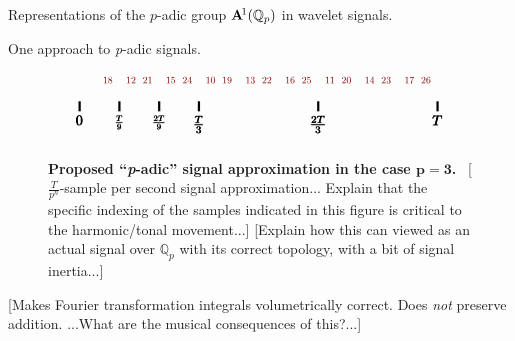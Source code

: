 \documentclass[letterpaper,11pt, reqno]{amsart}
\newtheorem{monodromy theorem}{Monodromy Theorem}[subsection]
\newtheorem{wild conjecture}[theorem]{Wild Conjecture}
\newtheorem{research objectives}{Research objectives}[subsection]
\newtheorem{research question}[theorem]{Research questions}
\newtheorem{aside question}[theorem]{Aside question}
\newtheorem{audio example}[theorem]{\loudspeaker[3] Example}
\newtheorem{blank remark}[theorem]{}
\newtheorem{terminology and comment}[theorem]{Terminology and comment}
\newtheorem{purity hypothesis}[theorem]{Purity hypothesis}
\newtheorem{corollary of the purity hypothesis}[theorem]{Corollary of the purity hypothesis}
\newcommand{\QQ} {{\mathbb Q}}
\numberwithin{equation}{theorem}
\begin{document}
\begin{section}{Representations of the $p$-adic group $\bold{A}^{\!1}(\mathbb{Q}_{p})$ in wavelet signals.}
\begin{subsection}{One approach to {\em p}-adic signals.}
\begin{figure}[ht]
$$\begin{tikzpicture}
	\node[red!50!black!100] at (2/3,.65) {\scalebox{.7}{$\ 18$}};
	\node[red!50!black!100] at (1+1/3,.65) {\scalebox{.7}{$12\ $}};
	\node[red!50!black!100] at (1+2/3,.65) {\scalebox{.7}{$\ 21$}};
	\node[red!50!black!100] at (2+1/3,.65) {\scalebox{.7}{$15\ $}};
	\node[red!50!black!100] at (2+2/3,.65) {\scalebox{.7}{$\ 24$}};
	\node[red!50!black!100] at (3+1/3,.65) {\scalebox{.7}{$10\ $}};
	\node[red!50!black!100] at (3+2/3,.65) {\scalebox{.7}{$\ 19$}};
	\node[red!50!black!100] at (4+1/3,.65) {\scalebox{.7}{$13\ $}};
	\node[red!50!black!100] at (4+2/3,.65) {\scalebox{.7}{$\ 22$}};
	\node[red!50!black!100] at (5+1/3,.65) {\scalebox{.7}{$16\ $}};
	\node[red!50!black!100] at (5+2/3,.65) {\scalebox{.7}{$\ 25$}};
	\node[red!50!black!100] at (6+1/3,.65) {\scalebox{.7}{$11\ $}};
	\node[red!50!black!100] at (6+2/3,.65) {\scalebox{.7}{$\ 20$}};
	\node[red!50!black!100] at (7+1/3,.65) {\scalebox{.7}{$14\ $}};
	\node[red!50!black!100] at (7+2/3,.65) {\scalebox{.7}{$\ 23$}};
	\node[red!50!black!100] at (8+1/3,.65) {\scalebox{.7}{$17\ $}};
	\node[red!50!black!100] at (8+2/3,.65) {\scalebox{.7}{$\ 26$}};
	\draw[black, ultra thick] (0,.125) -- (0,-.125);
	\draw[black, ultra thick] (1,.125) -- (1,-.125);
	\draw[black, ultra thick] (2,.125) -- (2,-.125);
	\draw[black, ultra thick] (3,.125) -- (3,-.125);
	\draw[black, ultra thick] (6,.125) -- (6,-.125);
	\draw[black, ultra thick] (9,.125) -- (9,-.125);
	\node[black] at (0,-.35) {\scalebox{1}{$\pmb{0}$}};
	\node[black] at (1,-.4) {\scalebox{.8}{$\pmb{\frac{T}{9}}$}};
	\node[black] at (2,-.4) {\scalebox{.8}{$\pmb{\frac{2T}{9}}$}};
	\node[black] at (3,-.45) {\scalebox{1}{$\pmb{\frac{T}{3}}$}};
	\node[black] at (6,-.45) {\scalebox{1}{$\pmb{\frac{2T}{3}}$}};
	\node[black] at (9,-.35) {\scalebox{1}{$\pmb{T}$}};
	\end{tikzpicture}
	$$
	\caption{{\bf Proposed ``{\em p}-adic'' signal approximation in the case $\pmb{p=3}$.}\ {\color{red} [$\frac{T}{p^n}$-sample per second signal approximation... Explain that the specific indexing of the samples indicated in this figure is critical to the harmonic/tonal movement...]} {\color{red} [Explain how this can viewed as an actual signal over $\QQ_{p}$ with its correct topology, with a bit of signal inertia...]}}
	\label{figure: p-adic signal proposal}
	\end{figure}
	
{\color{red} [Makes Fourier transformation integrals volumetrically correct. Does {\em not} preserve addition. ...What are the musical consequences of this?...]}


\end{subsection}
\end{section}
\end{document}
